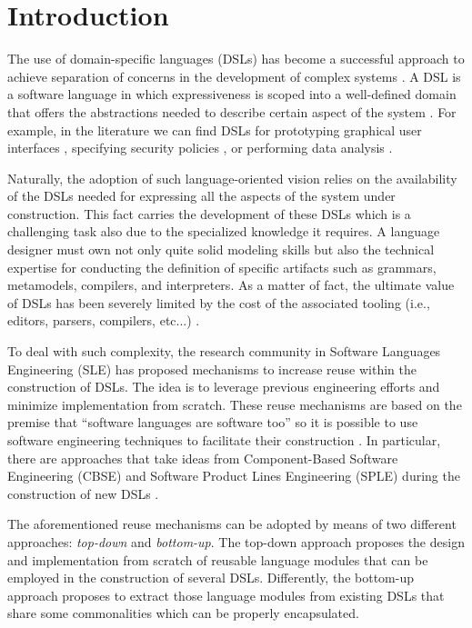 \section{Introduction}
\label{sec:introduction}

The use of domain-specific languages (DSLs) has become a successful approach to achieve separation of concerns in the development of complex systems \cite{Cook:2006}. A DSL is a software language in which expressiveness is scoped into a well-defined domain that offers the abstractions needed to describe certain aspect of the system \cite{Combemale:2014}. For example, in the literature we can find DSLs for prototyping graphical user interfaces \cite{Oney:2012}, specifying security policies \cite{Lodderstedt:2002}, or performing data analysis \cite{Eberius:2012}. 

Naturally, the adoption of such language-oriented vision relies on the availability of the DSLs needed for expressing all the aspects of the system under construction. This fact carries the development of these DSLs which is a challenging task also due to the specialized knowledge it requires. A language designer must own not only quite solid modeling skills but also the technical expertise for conducting the definition of specific artifacts such as grammars, metamodels, compilers, and interpreters. As a matter of fact, the ultimate value of DSLs has been severely limited by the cost of the associated tooling (i.e., editors, parsers, compilers, etc...) \cite{jezequel:2014}.

To deal with such complexity, the research community in Software Languages Engineering (SLE) has proposed mechanisms to increase reuse within the construction of DSLs. The idea is to leverage previous engineering efforts and minimize implementation from scratch. These reuse mechanisms are based on the premise that ``software languages are software too'' \cite{Favre:2011} so it is possible to use software engineering techniques to facilitate their construction \cite{Kleppe:2009}. In particular, there are approaches that take ideas from Component-Based Software Engineering (CBSE) and Software Product Lines Engineering (SPLE) during the construction of new DSLs \cite{Liebig:2013,Cazzola:2013b,White:2009}.

The aforementioned reuse mechanisms can be adopted by means of two different approaches: \textit{top-down} and \textit{bottom-up}. The top-down approach proposes the design and implementation from scratch of reusable language modules that can be employed in the construction of several DSLs. Differently, the bottom-up approach proposes to extract those language modules from existing DSLs that share some commonalities which can be properly encapsulated.

